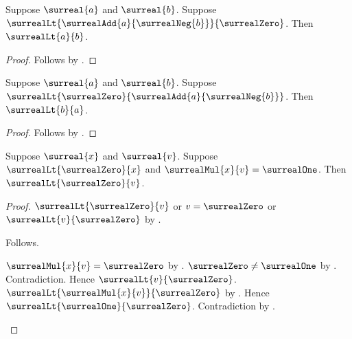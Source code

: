 \begin{lemma}\label{surreal_subtraction_negative_elim}
    Suppose $\surreal{a}$ and $\surreal{b}$.
    Suppose $\surrealLt{\surrealAdd{a}{\surrealNeg{b}}}{\surrealZero}$.
    Then $\surrealLt{a}{b}$.
\end{lemma}
\begin{proof}
    Follows by
        .
\end{proof}

\begin{lemma}\label{surreal_subtraction_positive_elim}
    Suppose $\surreal{a}$ and $\surreal{b}$.
    Suppose $\surrealLt{\surrealZero}{
        \surrealAdd{a}{\surrealNeg{b}}}$.
    Then $\surrealLt{b}{a}$.
\end{lemma}
\begin{proof}
    Follows by
        .
\end{proof}

\begin{lemma}\label{surreal_reciprocal_of_positive_is_positive}
    Suppose $\surreal{x}$ and $\surreal{v}$.
    Suppose $\surrealLt{\surrealZero}{x}$ and
        $\surrealMul{x}{v}=\surrealOne$.
    Then $\surrealLt{\surrealZero}{v}$.
\end{lemma}
\begin{proof}
    $\surrealLt{\surrealZero}{v}$ or $v=\surrealZero$ or
        $\surrealLt{v}{\surrealZero}$
        by .
    \begin{byCase}
            Follows.
            \begin{byCase}
                    $\surrealMul{x}{v}=\surrealZero$
                        by .
                    $\surrealZero\neq\surrealOne$
                        by .
                    Contradiction.
                    Hence $\surrealLt{v}{\surrealZero}$.
                    $\surrealLt{\surrealMul{x}{v}}{\surrealZero}$
                        by .
                    Hence $\surrealLt{\surrealOne}{\surrealZero}$.
                    Contradiction by
                        .
            \end{byCase}
    \end{byCase}
\end{proof}

